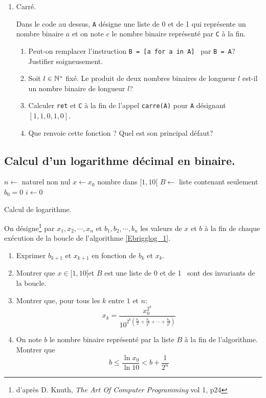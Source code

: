 \begin{enumerate}
\item Carré.

Dans le code au dessus, \texttt{A} désigne une liste de 0 et de 1 qui représente un nombre binaire $a$ et on note $c$ le nombre binaire représenté par \texttt{C} à la fin.
\begin{enumerate}
  \item Peut-on remplacer l'instruction \og\texttt{B = [a for a in A]}\fg~ par \og\texttt{B = A}\fg? Justifier soigneusement.
  \item Soit $l\in \mathbb{N}^*$ fixé. Le produit de deux nombres binaires de longueur $l$ est-il un nombre binaire de longueur $l$? 
  \item Calculer \texttt{ret} et \texttt{C} à la fin de l'appel \texttt{carre(A)} pour \texttt{A} désignant $[1,1,0,1,0]$.
  \item Que renvoie cette fonction ? Quel est son principal défaut?
\end{enumerate}
\end{enumerate}

\subsection{Calcul d'un logarithme décimal en binaire.}
\begin{algorithm}
  $n\leftarrow $ naturel non  nul\;
  $x\leftarrow x_{0}$ nombre dans $[1,10[$\;
  $B\leftarrow$ liste contenant seulement $b_0 = 0$ \;
  $i\leftarrow 0$\;
  \caption{Calcul de logarithme.}
  \label{Ebrigglog_1}
\end{algorithm}
On désigne\footnote{d'après D. Knuth, \emph{The Art Of Computer Programming} vol 1, p24} par $x_1,x_2,\cdots,x_{n}$ et $b_1,b_2,\cdots,b_{n}$ les valeurs de $x$ et $b$ à la fin de chaque exécution de la boucle de l'algorithme \ref{Ebrigglog_1}.
\begin{enumerate}
  \item Exprimer $b_{k+1}$ et $x_{k+1}$ en fonction de $b_k$ et $x_k$.
  \item Montrer que \og $x\in [1,10[$\fg et \og$B$ est une liste de 0 et de 1\fg~ sont des invariants de la boucle.
  \item Montrer que, pour tous les $k$ entre $1$ et $n$:
\begin{displaymath}
  x_k = \frac{x_{0}^{2^k}}{10^{2^{k}\left(\frac{b_1}{2}+\frac{b_2}{2^2}+\cdots+ \frac{b_k}{2^k}\right) }}
\end{displaymath}
\item On note $b$ le nombre binaire représenté par la liste $B$ à la fin de l'algorithme. Montrer que
\begin{displaymath}
  b \leq \frac{\ln x_0}{ \ln 10} < b + \frac{1}{2^{n}}
\end{displaymath}
\end{enumerate}

